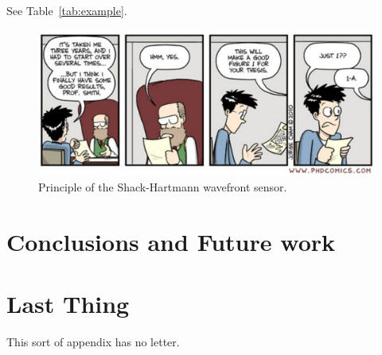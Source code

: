 \documentclass[a4paper,11pt,phdthesis,twoside,oneandhalfspace,pdflatex]{cssethesis} %
\begin{document}
See Table~\ref{tab:example}.

\begin{figure}[ht!]
\centering\includegraphics[width=0.9\linewidth]{phd101310s}
\caption{Principle of the Shack-Hartmann wavefront sensor.}
\label{fig:ShackHartmannWFS}
\end{figure}



\chapter{Conclusions and Future work}\label{chap:summary}



\backmatter %



\chapter{Last Thing} %
This sort of appendix has no letter. 



\pagestyle{plain}

 
\end{document}
